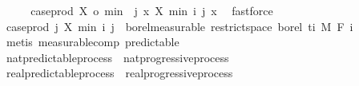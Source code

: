 \begin{isabellebody}
\ \ \isamarkupfalse%
\ \isamarkupfalse%
\ {\isachardoublequoteopen}case{\isacharunderscore}{\kern0pt}prod\ X\ o\ {\isacharquery}{\kern0pt}min\ {\isacharequal}{\kern0pt}\ {\isacharparenleft}{\kern0pt}{\isasymlambda}{\isacharparenleft}{\kern0pt}j{\isacharcomma}{\kern0pt}\ x{\isacharparenright}{\kern0pt}{\isachardot}{\kern0pt}\ X\ {\isacharparenleft}{\kern0pt}min\ i\ j{\isacharparenright}{\kern0pt}\ x{\isacharparenright}{\kern0pt}{\isachardoublequoteclose}\ \isamarkupfalse%
\ fastforce\isanewline
\ \ \isamarkupfalse%
\ \isamarkupfalse%
\ {\isachardoublequoteopen}case{\isacharunderscore}{\kern0pt}prod\ {\isacharparenleft}{\kern0pt}{\isasymlambda}j{\isachardot}{\kern0pt}\ X\ {\isacharparenleft}{\kern0pt}min\ i\ j{\isacharparenright}{\kern0pt}{\isacharparenright}{\kern0pt}\ {\isasymin}\ borel{\isacharunderscore}{\kern0pt}measurable\ {\isacharparenleft}{\kern0pt}restrict{\isacharunderscore}{\kern0pt}space\ borel\ {\isacharbraceleft}{\kern0pt}ti{\isacharbraceright}{\kern0pt}\ {\isasymOtimes}\isactrlsub M\ F\ i{\isacharparenright}{\kern0pt}{\isachardoublequoteclose}\ \isamarkupfalse%
\ {\isacharparenleft}{\kern0pt}metis\ measurable{\isacharunderscore}{\kern0pt}comp\ predictable{\isacharparenright}{\kern0pt}\isanewline
{}\isamarkupfalse%
%
\endisatagproof
{\isafoldproof}%
%
\isadelimproof
\isanewline
%
\endisadelimproof
\isanewline
{}\isamarkupfalse%
\ nat{\isacharunderscore}{\kern0pt}predictable{\isacharunderscore}{\kern0pt}process\ {\isasymsubseteq}\ nat{\isacharunderscore}{\kern0pt}progressive{\isacharunderscore}{\kern0pt}process%
\isadelimproof
\ %
\endisadelimproof
%
\isatagproof
\isacommand{{\isachardot}{\kern0pt}{\isachardot}{\kern0pt}}\isamarkupfalse%
%
\endisatagproof
{\isafoldproof}%
%
\isadelimproof
%
\endisadelimproof
\isanewline
{}\isamarkupfalse%
\ real{\isacharunderscore}{\kern0pt}predictable{\isacharunderscore}{\kern0pt}process\ {\isasymsubseteq}\ real{\isacharunderscore}{\kern0pt}progressive{\isacharunderscore}{\kern0pt}process%
\isadelimproof
\ %
\endisadelimproof
%
\isatagproof
\isacommand{{\isachardot}{\kern0pt}{\isachardot}{\kern0pt}}\isamarkupfalse%
%
\endisatagproof
{\isafoldproof}%
%
\isadelimproof
%
\endisadelimproof
%
\isadelimdocument
%
\endisadelimdocument
%
\isatagdocument
%
\isamarkuptrue%
%
\endisatagdocument
{\isafolddocument}%
%
\isadelimdocument

\end{isabellebody}

